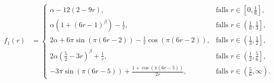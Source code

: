 \begin{align*}
  f_1(r)
  &=
  \begin{cases}
    \alpha-12(2-9r), 
    & \text{falls } r\in \left[0,\frac{1}{6}\right],\\
    \alpha\left(1+(6r-1)^\beta\right)-\frac{1}{r}, 
    & \text{falls } r\in \left(\frac{1}{6}, \frac{1}{3}\right],\\
    2\alpha+6\pi\sin(\pi(6r-2))-\frac{1}{r}\cos(\pi(6r-2)), 
    & \text{falls } r\in \left(\frac{1}{3}, \frac{1}{2}\right],\\
    2\alpha\left(\frac{5}{2}-3r\right)^\beta+\frac{1}{r},
    & \text{falls } r\in \left(\frac{1}{2}, \frac{5}{6}\right],\\
    -3\pi\sin(\pi(6r-5))+\frac{1+\cos(\pi(6r-5))}{2r}, 
    & \text{falls } r\in \left(\frac{5}{6}, \infty\right).
  \end{cases}
\end{align*}

